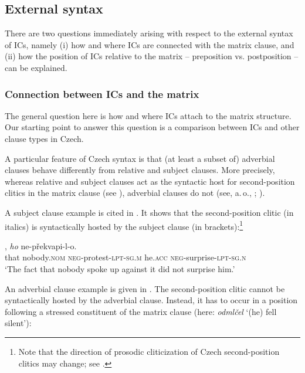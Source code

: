 \documentclass[output=paper,colorlinks,citecolor=brown,
modfonts,newtxmath
]{langscibook}
\begin{document}

\subsection{External syntax}\label{sec:syntax_external}

There are two questions immediately arising with respect to the external syntax of ICs, namely (i) how and where ICs are connected with the matrix clause, and (ii) how the position of ICs relative to the matrix -- preposition vs. postposition -- can be explained.

\subsubsection{Connection between ICs and the matrix}\label{sec:syntax_external_connection}

The general question here is how and where ICs attach to the matrix structure. Our starting point to answer this question is a comparison between ICs and other clause types in Czech.

A particular feature of Czech syntax is that (at least a subset of) adverbial clauses behave differently from relative and subject clauses. More precisely, whereas relative and subject clauses act as the syntactic host for second-position clitics in the matrix clause (see \citealt{Dokulil1956,Fried1994}), adverbial clauses do not (see, a.\,o., \citealt[109]{Dokulil1956}; \citealt[150]{Lenertova2004}). 

A subject clause example is cited in . It shows that the second-position clitic (in italics) is syntactically hosted by the subject clause (in brackets):\footnote{Note that the direction of prosodic cliticization of Czech second-position clitics may change; see \citet{Toman1996}.}

\ea\label{ex:Subjektsatz}
, \textit{ho} ne-překvapi-l-o.\\
	{} that nobody.\textsc{nom} \textsc{neg}-protest-\textsc{lpt-sg.m} he.\textsc{acc} \textsc{neg}-surprise-\textsc{lpt-sg.n}\\
\glt `The fact that nobody spoke up against it did not surprise him.' \\ \hfill \citep[Czech;][168]{Fried1994}
\z

\noindent An adverbial clause example is given in . The second-position clitic cannot be syntactically hosted by the adverbial clause. Instead, it has to occur in a position following a stressed constituent of the matrix clause (here: \textit{odmlčel} `(he) fell silent'):
\end{document}
